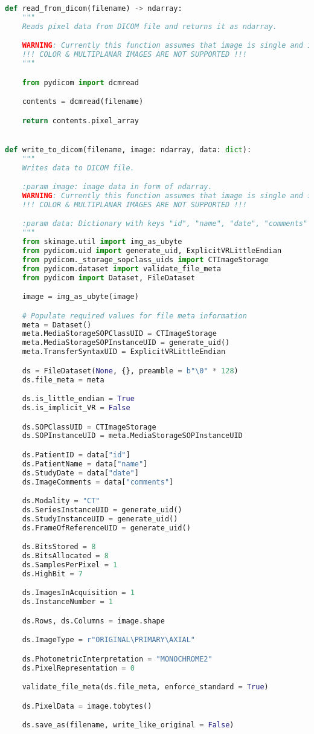 \documentclass[a4paper, 11pt]{article}
\begin{document}
\begin{lstlisting}[language = Python, caption = Obsługa DICOM, label = lst:dicom]
def read_from_dicom(filename) -> ndarray:
    """
    Reads pixel data from DICOM file and returns it as ndarray.

    WARNING: Currently this function assumes that image is single and in grayscale.
    !!! COLOR & MULTIPLANAR IMAGES ARE NOT SUPPORTED !!!
    """

    from pydicom import dcmread

    contents = dcmread(filename)

    return contents.pixel_array


def write_to_dicom(filename, image: ndarray, data: dict):
    """
    Writes data to DICOM file.

    :param image: image data in form of ndarray.
    WARNING: Currently this function assumes that image is single and in grayscale.
    !!! COLOR & MULTIPLANAR IMAGES ARE NOT SUPPORTED !!!

    :param data: Dictionary with keys "id", "name", "date", "comments" 
    """
    from skimage.util import img_as_ubyte
    from pydicom.uid import generate_uid, ExplicitVRLittleEndian
    from pydicom._storage_sopclass_uids import CTImageStorage
    from pydicom.dataset import validate_file_meta
    from pydicom import Dataset, FileDataset

    image = img_as_ubyte(image)

    # Populate required values for file meta information
    meta = Dataset()
    meta.MediaStorageSOPClassUID = CTImageStorage
    meta.MediaStorageSOPInstanceUID = generate_uid()
    meta.TransferSyntaxUID = ExplicitVRLittleEndian

    ds = FileDataset(None, {}, preamble = b"\0" * 128)
    ds.file_meta = meta

    ds.is_little_endian = True
    ds.is_implicit_VR = False

    ds.SOPClassUID = CTImageStorage
    ds.SOPInstanceUID = meta.MediaStorageSOPInstanceUID

    ds.PatientID = data["id"]
    ds.PatientName = data["name"]
    ds.StudyDate = data["date"]
    ds.ImageComments = data["comments"]

    ds.Modality = "CT"
    ds.SeriesInstanceUID = generate_uid()
    ds.StudyInstanceUID = generate_uid()
    ds.FrameOfReferenceUID = generate_uid()

    ds.BitsStored = 8
    ds.BitsAllocated = 8
    ds.SamplesPerPixel = 1
    ds.HighBit = 7

    ds.ImagesInAcquisition = 1
    ds.InstanceNumber = 1

    ds.Rows, ds.Columns = image.shape

    ds.ImageType = r"ORIGINAL\PRIMARY\AXIAL"

    ds.PhotometricInterpretation = "MONOCHROME2"
    ds.PixelRepresentation = 0

    validate_file_meta(ds.file_meta, enforce_standard = True)

    ds.PixelData = image.tobytes()

    ds.save_as(filename, write_like_original = False)
\end{lstlisting}
\end{document}
